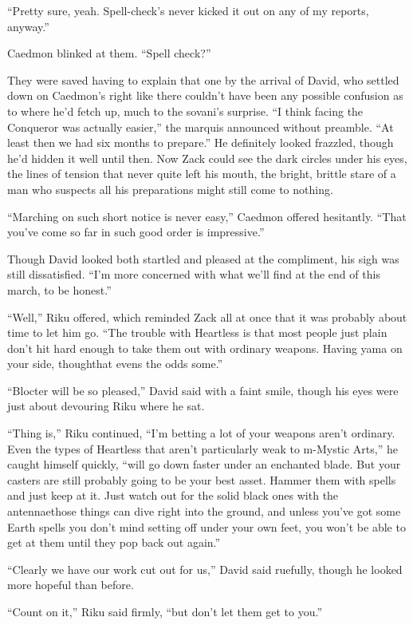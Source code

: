 ``Pretty sure, yeah. Spell-check's never kicked it out on any of my reports, anyway.''

Caedmon blinked at them. ``Spell check?''

They were saved having to explain that one by the arrival of David, who settled down on Caedmon's right like there couldn't have been any possible confusion as to where he'd fetch up, much to the sovani's surprise. ``I think facing the Conqueror was actually easier,'' the marquis announced without preamble. ``At least then we had six months to prepare.'' He definitely looked frazzled, though he'd hidden it well until then. Now Zack could see the dark circles under his eyes, the lines of tension that never quite left his mouth, the bright, brittle stare of a man who suspects all his preparations might still come to nothing.

``Marching on such short notice is never easy,'' Caedmon offered hesitantly. ``That you've come so far in such good order is impressive.''

Though David looked both startled and pleased at the compliment, his sigh was still dissatisfied. ``I'm more concerned with what we'll find at the end of this march, to be honest.''

``Well,'' Riku offered, which reminded Zack all at once that it was probably about time to let him go. ``The trouble with Heartless is that most people just plain don't hit hard enough to take them out with ordinary weapons. Having yama on your side, though\textemdash that evens the odds some.''

``Blocter will be so pleased,'' David said with a faint smile, though his eyes were just about devouring Riku where he sat.

``Thing is,'' Riku continued, ``I'm betting a lot of your weapons aren't ordinary. Even the types of Heartless that aren't particularly weak to m-Mystic Arts,'' he caught himself quickly, ``will go down faster under an enchanted blade. But your casters are still probably going to be your best asset. Hammer them with spells and just keep at it. Just watch out for the solid black ones with the antennae\textemdash those things can dive right into the ground, and unless you've got some Earth spells you don't mind setting off under your own feet, you won't be able to get at them until they pop back out again.''

``Clearly we have our work cut out for us,'' David said ruefully, though he looked more hopeful than before.

``Count on it,'' Riku said firmly, ``but don't let them get to you.''

